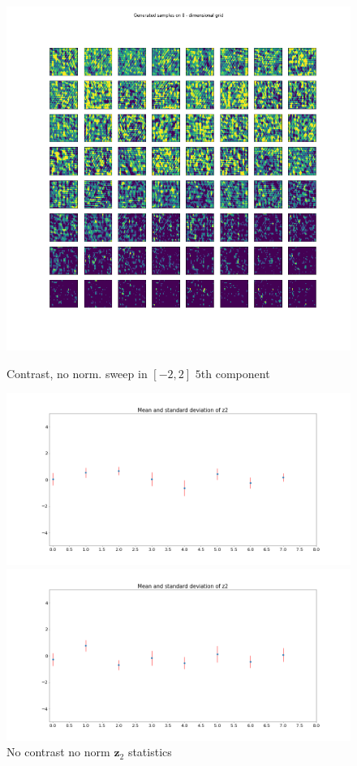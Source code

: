 \documentclass[12pt, english]{article}
\begin{document}
\begin{figure}[H]
\begin{minipage}{0.33\linewidth}
  \end{minipage} 
  \begin{minipage}{0.33\linewidth}
    \centering
    \includegraphics[width=.72\linewidth]{sweep/no_norm_contrast_sweep_minus_two_to_two_5th_param.png} 
    \caption{Contrast, no norm. \newline sweep in $[-2, 2]$ $5$th component} 
    \label{fig:contrast-no-norm-sweep-5}
  \end{minipage}
  \begin{minipage}{0.5\linewidth}
    \centering
    \includegraphics[width=.95\linewidth]{sweep/no_contrast_no_norm_z2_stats.png} 
    \caption{No contrast \newline no norm $\bm{z}_{2}$ statistics} 
    \label{fig:no-contrast-no-norm-stats}
  \end{minipage} 
  \begin{minipage}{0.5\linewidth}
    \centering
    \includegraphics[width=.95\linewidth]{sweep/contrast_no_norm_z2_stats.png} 

\end{minipage}
\end{figure}
\end{document}
